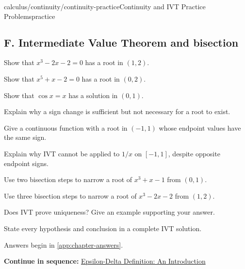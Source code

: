 \documentclass[11pt,openany]{book}
\theoremstyle{bgplain}
\newcommand{\webnext}[2]{%
  \par\addvspace{1.2em}\noindent{\color{BGLine}\rule{\textwidth}{0.35pt}}\par\smallskip
  {\small\color{BGGray}\textbf{Continue in sequence:} \hyperlink{web:#1}{#2}}\par
}
\begin{document}
\begin{webpage}{calculus/continuity/continuity-practice}{Continuity and IVT Practice Problems}{practice}
\subsection*{F. Intermediate Value Theorem and bisection}
\begin{bgexercises}[label=\textbf{5.\arabic*},resume]
  \item Show that \(x^3-2x-2=0\) has a root in \((1,2)\).
  \item Show that \(x^5+x-2=0\) has a root in \((0,2)\).
  \item Show that \(\cos x=x\) has a solution in \((0,1)\).
  \item Explain why a sign change is sufficient but not necessary for a root to exist.
  \item Give a continuous function with a root in \((-1,1)\) whose endpoint values have the same sign.
  \item Explain why IVT cannot be applied to \(1/x\) on \([-1,1]\), despite opposite endpoint signs.
  \item Use two bisection steps to narrow a root of \(x^3+x-1\) from \((0,1)\).
  \item Use three bisection steps to narrow a root of \(x^3-2x-2\) from \((1,2)\).
  \item Does IVT prove uniqueness? Give an example supporting your answer.
  \item State every hypothesis and conclusion in a complete IVT solution.
\end{bgexercises}

Answers begin in \cref{app:chapter-answers}.
\webnext{calculus/limits/epsilon-delta-introduction}{Epsilon-Delta Definition: An Introduction}
\end{webpage}


\end{document}
